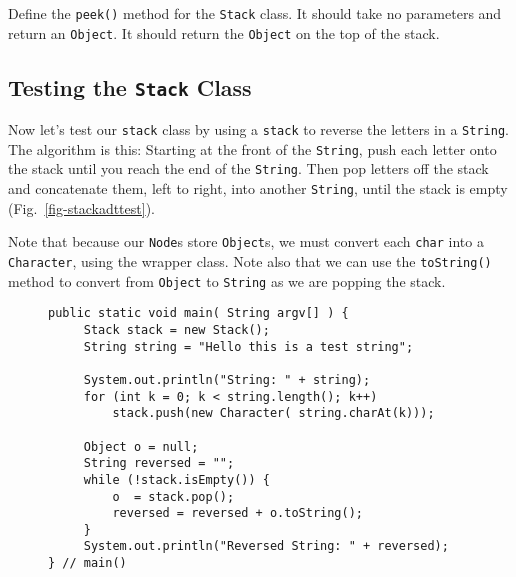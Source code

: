 

\label{self-study-exercise}
\begin{SSTUDY}

\item  Define the {\tt peek()} method for the
{\tt Stack} class.  It should
take no parameters and return an {\tt Object}. It should return the
{\tt Object} on the top of the stack.
\end{SSTUDY}


\subsection{Testing the {\tt Stack} Class}
\noindent Now let's test our {\tt stack} class by 
using a {\tt stack} to reverse the letters in a {\tt String}.  The
algorithm is this: Starting at the front of the {\tt String}, push
each letter onto the stack until you reach the end of the
{\tt String}. Then pop letters off the stack and concatenate them, left to
right, into another {\tt String}, until the stack is empty
(Fig.~\ref{fig-stackadttest}).

Note that because our {\tt Node}s store {\tt Object}s,
we must convert each {\tt char} into a {\tt Character}, using the
wrapper class.  Note also that we can use the {\tt toString()} method
to convert from {\tt Object} to {\tt String} as we are popping the
stack.

\begin{figure}[h]
\jjjprogstart
\begin{jjjlisting}
\begin{lstlisting}
public static void main( String argv[] ) {
     Stack stack = new Stack();
     String string = "Hello this is a test string";

     System.out.println("String: " + string);
     for (int k = 0; k < string.length(); k++)
         stack.push(new Character( string.charAt(k)));

     Object o = null;
     String reversed = "";
     while (!stack.isEmpty()) {
         o  = stack.pop();
         reversed = reversed + o.toString();
     }
     System.out.println("Reversed String: " + reversed);
} // main()
\end{lstlisting}
\end{jjjlisting}
\end{figure}


